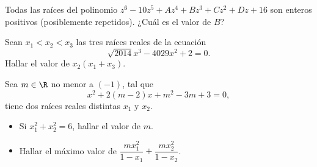 \begin{multicols}{2}
    \begin{problem}
        Todas las raíces del polinomio $z^6 - 10z^5 + Az^4 + Bz^3 + Cz^2 + Dz + 16$ son enteros positivos (posiblemente repetidos).
        ¿Cuál es el valor de $B$?
    \end{problem}

    \begin{problem}
        Sean $x_1 < x_2 < x_3$ las tres raíces reales de la ecuación
        \[
            \sqrt {2014} x^3 - 4029x^2 + 2 = 0.
        \]
        Hallar el valor de $x_2(x_1 + x_3).$
    \end{problem}

    \begin{problem}
        Sea $m \in \R$ no menor a $(-1)$, tal que
        \[
            x^2 + 2(m - 2)x + m^2 - 3m + 3 = 0,
        \]
        tiene dos raíces reales distintas $x_1$ y $x_2$.
        \begin{itemize}
            \item Si $x_1^2 + x_2^2 = 6$, hallar el valor de $m$.
            \item Hallar el máximo valor de $\dfrac{m x_1^2}{1 - x_1} + \dfrac{m x_2^2}{1 - x_2}$.
        \end{itemize}
    \end{problem}
\end{multicols}